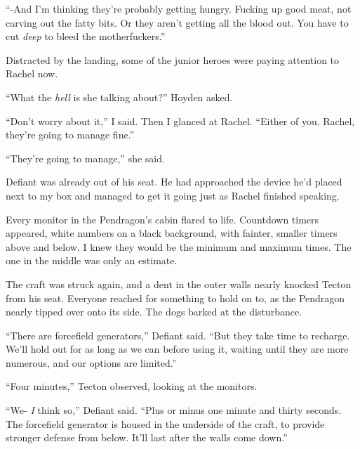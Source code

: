 ``-And I'm thinking they're probably getting hungry.  Fucking up good meat, not carving out the fatty bits.  Or they aren't getting all the blood out.  You have to cut \emph{deep }to bleed\emph{ }the motherfuckers.''



Distracted by the landing, some of the junior heroes were paying attention to Rachel now.



``What the \emph{hell} is she talking about?'' Hoyden asked.



``Don't worry about it,'' I said.  Then I glanced at Rachel.  ``Either of you.  Rachel, they're going to manage fine.''



``They're going to manage,'' she said.



Defiant was already out of his seat.  He had approached the device he'd placed next to my box and managed to get it going just as Rachel finished speaking.



Every monitor in the Pendragon's cabin flared to life.  Countdown timers appeared, white numbers on a black background, with fainter, smaller timers above and below.  I knew they would be the minimum and maximum times.  The one in the middle was only an estimate.



The craft was struck again, and a dent in the outer walls nearly knocked Tecton from his seat.  Everyone reached for something to hold on to, as the Pendragon nearly tipped over onto its side.  The dogs barked at the disturbance.



``There are forcefield generators,'' Defiant said.  ``But they take time to recharge.  We'll hold out for as long as we can before using it, waiting until they are more numerous, and our options are limited.''



``Four minutes,'' Tecton observed, looking at the monitors.



``We- \emph{I} think so\emph{,}'' Defiant said.  ``Plus or minus one minute and thirty seconds.  The forcefield generator is housed in the underside of the craft, to provide stronger defense from below.  It'll last after the walls come down.''




